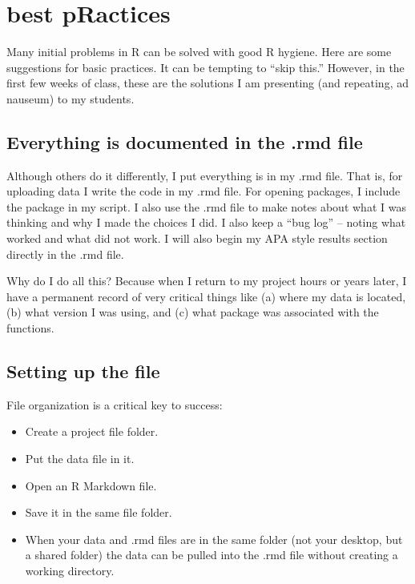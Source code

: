 \documentclass[
  11pt,
]{book}
\providecommand{\tightlist}{%
  \setlength{\itemsep}{0pt}\setlength{\parskip}{0pt}}
\begin{document}
\hypertarget{best-practices}{%
\section{best pRactices}\label{best-practices}}

Many initial problems in R can be solved with good R hygiene. Here are some suggestions for basic practices. It can be tempting to ``skip this.'' However, in the first few weeks of class, these are the solutions I am presenting (and repeating, ad nauseum) to my students.

\hypertarget{everything-is-documented-in-the-.rmd-file}{%
\subsection{Everything is documented in the .rmd file}\label{everything-is-documented-in-the-.rmd-file}}

Although others do it differently, I put everything is in my .rmd file. That is, for uploading data I write the code in my .rmd file. For opening packages, I include the package in my script. I also use the .rmd file to make notes about what I was thinking and why I made the choices I did. I also keep a ``bug log'' -- noting what worked and what did not work. I will also begin my APA style results section directly in the .rmd file.

Why do I do all this? Because when I return to my project hours or years later, I have a permanent record of very critical things like (a) where my data is located, (b) what version I was using, and (c) what package was associated with the functions.

\hypertarget{setting-up-the-file}{%
\subsection{Setting up the file}\label{setting-up-the-file}}

File organization is a critical key to success:

\begin{itemize}
\tightlist
\item
  Create a project file folder.
\item
  Put the data file in it.
\item
  Open an R Markdown file.
\item
  Save it in the same file folder.
\item
  When your data and .rmd files are in the same folder (not your desktop, but a shared folder) the data can be pulled into the .rmd file without creating a working directory.
\end{itemize}
\end{document}

